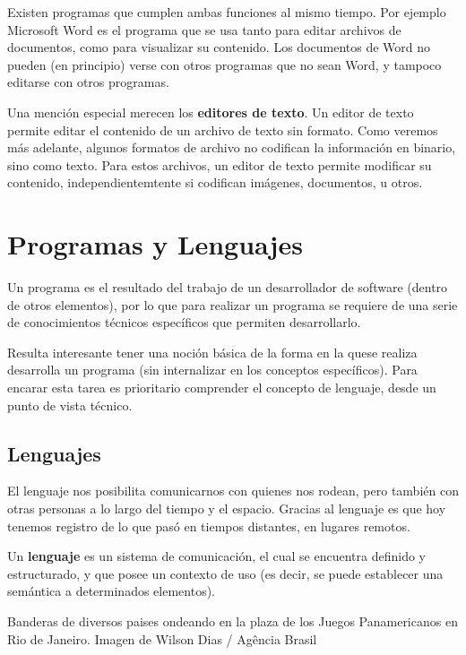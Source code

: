 Existen programas que cumplen ambas funciones al mismo tiempo. Por ejemplo
Microsoft Word es el programa que se usa tanto para editar archivos de documentos,
como para visualizar su contenido. Los documentos de Word no pueden (en principio)
verse con otros programas que no sean Word, y tampoco editarse con otros programas.

Una mención especial merecen los \textbf{editores de texto}. Un editor de texto
permite editar el contenido de un archivo de texto sin formato. Como veremos más
adelante, algunos formatos de archivo no codifican la información en binario,
sino como texto. Para estos archivos, un editor de texto permite modificar su
contenido, independientemtente si codifican imágenes, documentos, u otros.

\section{Programas y Lenguajes}

Un programa es el resultado del trabajo de un desarrollador de software (dentro
de otros elementos), por lo que para realizar un programa se requiere de una serie
de conocimientos técnicos específicos que permiten desarrollarlo.

Resulta interesante tener una noción básica de la forma en la quese realiza 
desarrolla un programa (sin internalizar en los conceptos específicos). Para
encarar esta tarea es prioritario comprender el concepto de lenguaje, desde un
punto de vista técnico.

\subsection{Lenguajes}

El lenguaje nos posibilita comunicarnos con quienes nos rodean, pero también
con otras personas a lo largo del tiempo y el espacio. Gracias al lenguaje
es que hoy tenemos registro de lo que pasó en tiempos distantes, en lugares remotos.

\begin{definition}
    Un \textbf{lenguaje} es un sistema de comunicación, el cual se encuentra definido y
    estructurado, y que posee un contexto de uso (es decir, se puede establecer
    una semántica a determinados elementos).
\end{definition}

{Banderas de diversos paises ondeando en la plaza de los Juegos Panamericanos en Rio de Janeiro.}
{Imagen de Wilson Dias / Ag\^encia Brasil}

